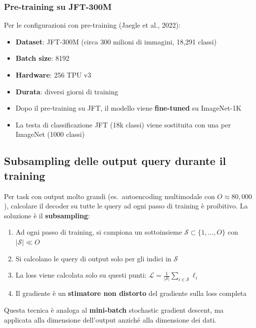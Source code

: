 \documentclass[12pt,a4paper]{article}
\begin{document}
\subsubsection{Pre-training su JFT-300M}

Per le configurazioni con pre-training (Jaegle et al., 2022):
\begin{itemize}
    \item \textbf{Dataset}: JFT-300M (circa 300 milioni di immagini, 18{,}291 classi)
    \item \textbf{Batch size}: 8192
    \item \textbf{Hardware}: 256 TPU v3
    \item \textbf{Durata}: diversi giorni di training
    \item Dopo il pre-training su JFT, il modello viene \textbf{fine-tuned} su ImageNet-1K
    \item La testa di classificazione JFT (18k classi) viene sostituita con una per ImageNet (1000 classi)
\end{itemize}

\subsection{Subsampling delle output query durante il training}

Per task con output molto grandi (es.\ autoencoding multimodale con $O \approx 80{,}000$), calcolare il decoder su tutte le query ad ogni passo di training \`e proibitivo. La soluzione \`e il \textbf{subsampling}:

\begin{enumerate}
    \item Ad ogni passo di training, si campiona un sottoinsieme $\mathcal{S} \subset \{1, \ldots, O\}$ con $|\mathcal{S}| \ll O$
    \item Si calcolano le query di output solo per gli indici in $\mathcal{S}$
    \item La loss viene calcolata solo su questi punti: $\mathcal{L} = \frac{1}{|\mathcal{S}|}\sum_{i \in \mathcal{S}} \ell_i$
    \item Il gradiente \`e un \textbf{stimatore non distorto} del gradiente sulla loss completa
\end{enumerate}

Questa tecnica \`e analoga al \textbf{mini-batch} stochastic gradient descent, ma applicata alla dimensione dell'output anzich\'e alla dimensione dei dati.
\end{document}

